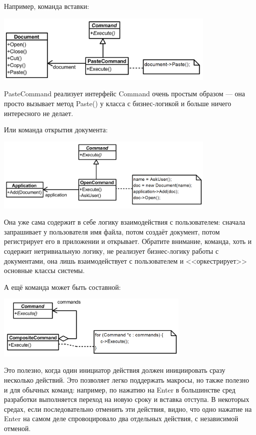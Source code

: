 \documentclass{../../text-style}
\begin{document}
Например, команда вставки:

\begin{center}
    \includegraphics[width=0.8\textwidth]{pasteCommand.png}
\end{center}

PasteCommand реализует интерфейс Command очень простым образом --- она просто вызывает метод Paste() у класса с бизнес-логикой и больше ничего интересного не делает.

Или команда открытия документа:

\begin{center}
    \includegraphics[width=0.8\textwidth]{openDocumentCommand.png}
\end{center}

Она уже сама содержит в себе логику взаимодействия с пользователем: сначала запрашивает у пользователя имя файла, потом создаёт документ, потом регистрирует его в приложении и открывает. Обратите внимание, команда, хоть и содержит нетривиальную логику, не реализует бизнес-логику работы с документами, она лишь взаимодействует с пользователем и <<оркестрирует>> основные классы системы.

А ещё команда может быть составной:

\begin{center}
    \includegraphics[width=0.7\textwidth]{compositeCommand.png}
\end{center}

Это полезно, когда один инициатор действия должен инициировать сразу несколько действий. Это позволяет легко поддержать макросы, но также полезно и для обычных команд: например, по нажатию на Enter в большинстве сред разработки выполняется переход на новую сроку и вставка отступа. В некоторых средах, если последовательно отменить эти действия, видно, что одно нажатие на Enter на самом деле спровоцировало два отдельных действия, с независимой отменой.
\end{document}
